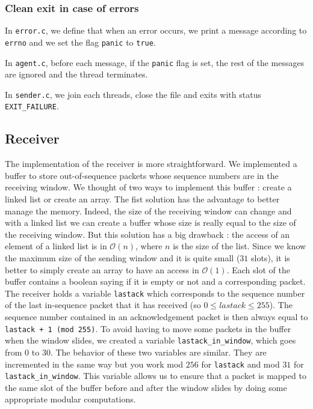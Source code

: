 \documentclass[11pt,a4paper]{article}
\begin{document}
\subsubsection{Clean exit in case of errors}
In \lstinline|error.c|, we define that when an error occurs, we print a message according to \lstinline|errno|
and we set the flag \lstinline|panic| to \lstinline|true|.

In \lstinline|agent.c|, before each message, if the \lstinline|panic| flag is set,
the rest of the messages are ignored and the thread terminates.

In \lstinline|sender.c|, we join each threads, close the file and exits with status \lstinline|EXIT_FAILURE|.

\subsection{Receiver}
The implementation of the receiver is more straightforward. We implemented a buffer to store out-of-sequence packets whose sequence numbers are in the receiving window. We thought of two ways to implement this buffer : create a linked list or create an array. The fist solution has the advantage to better manage the memory. Indeed, the size of the receiving window can change and with a linked list we can create a buffer whose size is really equal to the size of the receiving window. But this solution has a big drawback : the access of an element of a linked list is in $\mathcal{O}(n)$, where $n$ is the size of the list. Since we know the maximum size of the sending window and it is quite small ($31$ slots), it is better to simply create an array to have an access in $\mathcal{O}(1)$. Each slot of the buffer contains a boolean saying if it is empty or not and a corresponding packet. The receiver holds a variable \texttt{lastack} which corresponds to the sequence number of the last in-sequence packet that it has received (so $0 \leq lastack \leq 255$). The sequence number contained in an acknowledgement packet is then always equal to \texttt{lastack + 1 (mod 255)}. To avoid having to move some packets in the buffer when the window slides, we created a variable \texttt{lastack\_in\_window}, which goes from $0$ to $30$. The behavior of these two variables are similar. They are incremented in the same way but you work mod $256$ for \texttt{lastack} and mod $31$ for \texttt{lastack\_in\_window}. This variable allows us to ensure that a packet is mapped to the same slot of the buffer before and after the window slides by doing some appropriate modular computations. 
\end{document}
